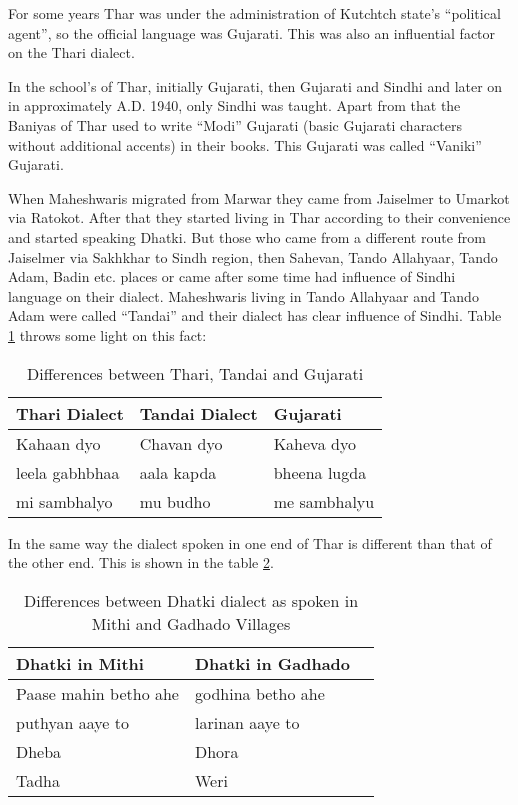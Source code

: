 For some years Thar was under the administration of Kutchtch state's ``political
agent'', so the official language was Gujarati. This was also an influential
factor on the Thari dialect.

In the school's of Thar, initially Gujarati, then Gujarati and Sindhi and later
on in approximately A.D. 1940, only Sindhi was taught. Apart from that the
Baniyas of Thar used to write ``Modi'' Gujarati (basic Gujarati characters
without additional accents) in their books. This Gujarati was called ``Vaniki''
Gujarati.

When Maheshwaris migrated from Marwar they came from Jaiselmer to Umarkot via
Ratokot. After that they started living in Thar according to their convenience
and started speaking Dhatki. But those who came from a different route from
Jaiselmer via Sakhkhar to Sindh region, then Sahevan, Tando Allahyaar, Tando
Adam, Badin etc. places or came after some time had influence of Sindhi language
on their dialect. Maheshwaris living in Tando Allahyaar and Tando Adam were
called ``Tandai'' and their dialect has clear influence of Sindhi. Table
\ref{tbl:difftharitandaiguj} throws some light on this fact:
\begin{table}
\begin{center}
\begin{tabular}{lll}
\hline
\textbf{Thari Dialect} & \textbf{Tandai Dialect} & \textbf{Gujarati} \\
\hline
Kahaan dyo & Chavan dyo & Kaheva dyo \\ 
leela gabhbhaa & aala kapda & bheena lugda \\ 
mi sambhalyo & mu budho & me sambhalyu\\
\hline
\end{tabular}
\end{center}
\caption{Differences between Thari, Tandai and Gujarati}
\label{tbl:difftharitandaiguj}
\end{table}
In the same way the dialect spoken in one end of Thar is different than that of
the other end. This is shown in the table \ref{tbl:diffmithigad}.
\begin{table}
\begin{center}
\begin{tabular}{lll}
\hline
\textbf{Dhatki in Mithi} & \textbf{Dhatki in Gadhado} \\
\hline
Paase mahin betho ahe & godhina betho ahe \\
puthyan aaye to & larinan aaye to \\
Dheba & Dhora\\
Tadha & Weri\\
\hline
\end{tabular}
\end{center}
\caption{Differences between Dhatki dialect as spoken in Mithi and Gadhado Villages}
\label{tbl:diffmithigad}
\end{table}
